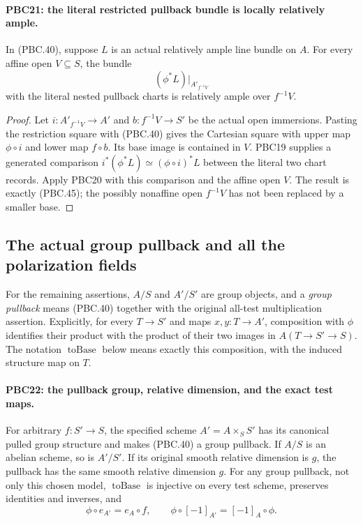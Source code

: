 \documentclass[11pt,a4paper]{article}
\numberwithin{equation}{section}
\theoremstyle{remark}\newtheorem{remark}[theorem]{Remark}
\begin{document}
\paragraph{PBC21: the literal restricted pullback bundle is locally relatively ample.}
\label{claim:PBC21}
In (PBC.40), suppose $L$ is an actual relatively ample
line bundle on $A$.  For every affine open $V\subseteq S$,
the bundle
\[
 (\phi^*L)|_{A'_{f^{-1}V}}
                                                        \tag{PBC.45}
\]
with the literal nested pullback charts is relatively ample
over $f^{-1}V$.

\begin{proof}
Let $i:A'_{f^{-1}V}\to A'$ and
$b:f^{-1}V\to S'$ be the actual open immersions.
Pasting the restriction square with (PBC.40) gives the
Cartesian square with upper map $\phi\circ i$ and lower
map $f\circ b$.  Its base image is contained in $V$.
PBC19 supplies a generated comparison
$i^*(\phi^*L)\simeq(\phi\circ i)^*L$ between the literal
two chart records.  Apply PBC20 with this comparison and
the affine open $V$.
The result is exactly (PBC.45); the possibly nonaffine
open $f^{-1}V$ has not been replaced by a smaller base.
\end{proof}

\subsection{The actual group pullback and all the polarization fields}

For the remaining assertions, $A/S$ and $A'/S'$ are group
objects, and a \emph{group pullback} means (PBC.40) together
with the original all-test multiplication assertion.
Explicitly, for every $T\to S'$ and maps $x,y:T\to A'$,
composition with $\phi$ identifies their product with the
product of their two images in $A(T\to S'\to S)$.
The notation $\operatorname{toBase}$ below means exactly
this composition, with the induced structure map on $T$.

\paragraph{PBC22: the pullback group, relative dimension, and the exact test maps.}
\label{claim:PBC22}
For arbitrary $f:S'\to S$, the specified scheme
$A'=A\times_S S'$ has its canonical pulled group structure
and makes (PBC.40) a group pullback.  If $A/S$ is an
abelian scheme, so is $A'/S'$.  If its original smooth
relative dimension is $g$, the pullback has the same
smooth relative dimension $g$.
For any group pullback, not only this chosen model,
$\operatorname{toBase}$ is injective on every test scheme,
preserves identities and inverses, and
\[
 \phi\circ e_{A'}=e_A\circ f,\qquad
 \phi\circ[-1]_{A'}=[-1]_A\circ\phi .
                                                        \tag{PBC.46}
\]
\end{document}
